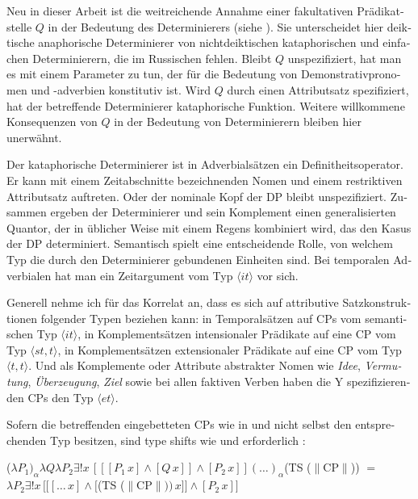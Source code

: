 \documentclass[output=paper, colorlinks, citecolor=brown, booklanguage=german]{langscibook}
\begin{document}
\begin{otherlanguage}{german}
Neu in dieser Arbeit ist die weitreichende Annahme einer fakultativen Prä\-di\-kat\-stel\-le $Q$ in der Bedeutung des Determinierers (siehe ). Sie unterscheidet hier deiktische anaphorische Determinierer von nichtdeiktischen kataphorischen und einfachen Determinierern, die im Russischen fehlen. Bleibt $Q$ unspezifiziert, hat man es mit einem Parameter zu tun, der für die Bedeutung von Demonstrativpronomen und -adverbien konstitutiv ist. Wird $Q$ durch einen Attributsatz spezifiziert, hat der betreffende Determinierer kataphorische Funktion. Weitere willkommene Konsequenzen von $Q$ in der Bedeutung von De\-ter\-mi\-nie\-rern bleiben hier unerwähnt.

Der kataphorische Determinierer ist in Adverbialsätzen ein Definitheitsope\-ra\-tor. Er kann mit einem Zeitabschnitte bezeichnenden Nomen und einem restriktiven Attributsatz auftreten. Oder der nominale Kopf der DP bleibt un\-spe\-zi\-fi\-ziert. Zusammen ergeben der Determinierer und sein Komplement einen ge\-ne\-ra\-li\-sier\-ten Quantor, der in üblicher Weise mit einem Regens kombiniert wird, das den Kasus der DP determiniert. Semantisch spielt eine entscheidende Rolle, von welchem Typ die durch den Determinierer gebundenen Einheiten sind. Bei temporalen Adverbialen hat man ein Zeitargument vom Typ $\langle it \rangle$ vor sich.

Generell nehme ich für das Korrelat an, dass es sich auf attributive Satzkonstruktionen folgender Typen beziehen kann: in Temporalsätzen auf CPs vom semantischen Typ $\langle it \rangle$, in Komplementsätzen intensionaler Prädikate auf eine CP vom Typ $\langle st,t \rangle$, in Komplementsätzen extensionaler Prädikate auf eine CP vom Typ $\langle t,t \rangle$. Und als Komplemente oder Attribute abstrakter Nomen wie \textit{Idee}, \textit{Vermutung}, \textit{Überzeugung}, \textit{Ziel} sowie bei allen faktiven Verben haben die Y spezifizierenden CPs den Typ $\langle et \rangle$.

Sofern die betreffenden eingebetteten CPs wie in  und  nicht selbst den entsprechenden Typ besitzen, sind type shifts wie  und  erforderlich \citep{Zimmermann2015,Zimmermann2016}:

\ea \label{ex:18:47} ($\lambda P_1)_\alpha \lambda Q \lambda P_2 \exists !x\, [[[P_1\, x] \wedge [Q\, x]] \wedge [P_2\, x]] (\dots)_\alpha$(TS ($\parallel$CP$\parallel$)) $=$
\newline
$\lambda P_2 \exists !x\, [[[\dots \,x] \wedge [$(TS ($\parallel$CP$\parallel$$))\, x]] \wedge [P_2\, x]]$
\z


\end{otherlanguage}
\end{document}

